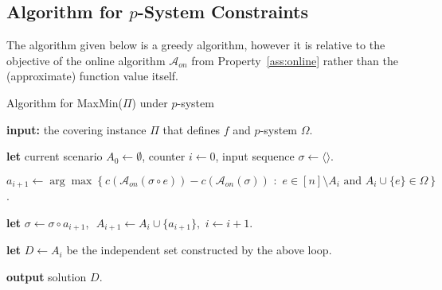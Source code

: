 \documentclass[11pt,letterpaper]{article}
\def\a{\ensuremath{\mathcal{A}}\xspace}
\def\cov{\ensuremath{\Pi}\xspace}
\def\mmp{{\sf MaxMin(\cov)}\xspace}
\begin{document}
\subsection{Algorithm for $p$-System Constraints}
The algorithm given below is a greedy algorithm, however it is relative to the objective of the online algorithm
$\a_{on}$ from Property~\ref{ass:online} rather than the (approximate) function value itself.
\begin{algorithm}
  \caption{Algorithm for \mmp under $p$-system}
  \begin{algorithmic}[1]
\STATE \textbf{input:} the covering instance \cov that defines $f$ and $p$-system $\Omega$.

\STATE \textbf{let} current scenario $A_0 \gets \emptyset$, counter $i\leftarrow 0$, input sequence $\sigma\gets
\langle \rangle$.


    \STATE $a_{i+1}\leftarrow \arg\max\left\{ c(\a_{on}(\sigma \circ e)) -
    c(\a_{on}(\sigma)) \,\, : \,\,e\in [n]\setminus A_i \text{ and } A_i \cup
    \{e\}\in \Omega\right\}$.

    \STATE \textbf{let} $\sigma \gets \sigma \circ a_{i+1}$,\,\, $A_{i+1} \gets A_i \cup \{a_{i+1}\}, \,\, i \gets i+1$.

    \ENDWHILE

    \STATE \label{step:mm} \textbf{let} $D \gets A_i$ be the independent set constructed by the above loop.

    \STATE \textbf{output} solution $D$.
\end{algorithmic}
\end{algorithm}
\end{document}
